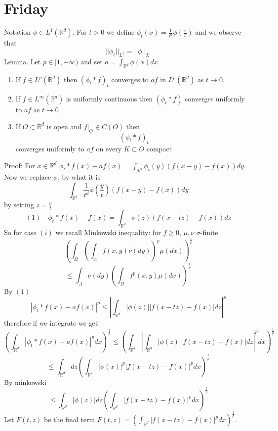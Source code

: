 \documentclass[11pt]{article}
\begin{document}
\section{Friday}
Notation $\phi \in L^{1}( \mathbb{R}^{d})$. For $t > 0$
we define  $\phi_t(x) = \frac{1}{t^{d}}\phi(\frac{x}{t})$ and we observe that
\[
    ||\phi_t||_{L^{1}} = ||\phi||_{L^{1}}
\] 
Lemma. Let $p \in [1,+\infty)$ and set $a = \int_{ \mathbb{R}^{d}}^{}\phi(x)dx$
\begin{enumerate}
    \item If $f \in L^{p}( \mathbb{R}^{d})$ then $(\phi_t * f)_t$ converges to $af$ in  $ L^{p}( \mathbb{R}^{d})$ as $t \to 0$.
    \item If  $f \in L^{\infty} ( \mathbb{R}^{d})$ is uniformly continuous then $(\phi_t * f)$ converges uniformly to $af$ as
         $t \to 0$ 
     \item If $O \subset \mathbb{R}^{d}$ is open and $f|_O \in C(O)$ then
          \[
              (\phi_t * f)_t
         \] 
         converges uniformly to $af$ on every  $K \subset O$ compact
\end{enumerate}
Proof: For $x \in \mathbb{R}^{d}$ $\phi_t * f(x) - af(x) = \int_{ \mathbb{R}^{d}}^{} \phi_t(y)(f(x-y)-f(x))dy $.
Now we replace $\phi_t$ by what it is
\[
\int_{ \mathbb{R}^{d}}^{}\frac{1}{t^{d}}\phi\left(\frac{y}{t}\right)(f(x-y)-f(x))dy
\] 
by setting $z = \frac{y}{t}$
\[
    (1) \quad \phi_t* f(x) - f(x) = \int_{ \mathbb{R}^{d}}^{} \phi(z) \left(f(x-tz) - f(x)\right) dz
\] 
So for case $(i)$ we recall Minkowski inequality: for $f \ge 0$, $\mu ,\nu$ $\sigma$-finite
\[
\left(\int_{\Omega}^{}\left(\int_{ \Lambda}^{} f(x,y) \nu(dy)\right)^{p} \mu(dx)\right)^{\frac{1}{p}}
\] 
\[
\le \int_{\Lambda}^{} \nu(dy)\left(\int_{\Omega}^{}f^{p}(x,y) \mu(dx)\right)^{\frac{1}{p}}
\] 
By $(1)$
 \[
\left|\phi_t * f(x) - af(x)\right|^{p} \le \left|\int_{ \mathbb{R}^{d} }^{} |\phi(z)| |f(x-tz) - f(x)|dz \right|^{p}
\] 
therefore
if we integrate we get
\[
\left(\int_{ \mathbb{R}^{d}}^{}\left|\phi_t * f(x) - af(x)\right|^{p} dx \right)^{\frac{1}{p}} \le  \left(\int_{ \mathbb{R}^{d}}^{}\left|\int_{ \mathbb{R}^{d} }^{} |\phi(z)| |f(x-tz) - f(x)|dz \right|^{p}dx\right)^{\frac{1}{p}}
\] 
\[
\le \int_{ \mathbb{R}^{d}}^{} dz\left( \int_{ \mathbb{R}^{d}}^{} |\phi(x)|^{p}|f(x-tz)-f(x)|^{p}dx \right)^{\frac{1}{p}}
\] 
By minkowski
\[
\le \int_{ \mathbb{R}^{d}}^{}|\phi(z)|dz\left( \int_{ \mathbb{R}^{d}}^{}|f(x-tz) - f(x)|^{p}dx\right)^{\frac{1}{p}}
\] 
Let $F(t,z)$ be the final term  $F(t,z) = \left(\int_{ \mathbb{R}^{d}}^{} |f(x-tz) - f(x)|^{p}dx\right)^{\frac{1}{p}}$.
\end{document}
